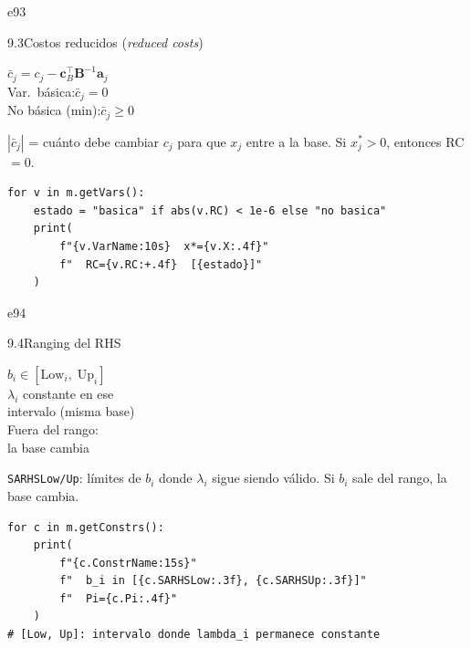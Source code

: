 \documentclass[10pt,a4paper]{article}
\newlength{\mathcolw}
\newlength{\codecolw}
\newcommand{\entryheader}[2][]{%
  \needspace{5cm}%
  \vspace{6pt}%
  \ifx\relax#1\relax\else\phantomsection\hypertarget{#1}{}\fi%
  \noindent%
  \begin{tcolorbox}[
    colback=subsecbg!18,
    colframe=subsecbg!45,
    sharp corners, boxrule=0.4pt,
    left=5pt, right=5pt, top=2pt, bottom=2pt,
    fontupper=\small\bfseries\sffamily,
  ]
  #2
  \end{tcolorbox}%
  \vspace{2pt}%
}
\newcommand{\py}[1]{\texttt{\small #1}}
\begin{document}
\vspace{4pt}

\entryheader[e93]{9.3\quad Costos reducidos (\textit{reduced costs})}
\noindent
\begin{minipage}[t]{\mathcolw}
    \begin{tcolorbox}[mathbox]
        $\bar{c}_j = c_j - \mathbf{c}_B^\top \mathbf{B}^{-1} \mathbf{a}_j$\\[6pt]
        Var.\ b\'asica:\enspace $\bar{c}_j = 0$\\[2pt]
        No b\'asica (min):\enspace $\bar{c}_j \geq 0$
    \end{tcolorbox}
    \vspace{2pt}
    \begin{tcolorbox}[notebox]
        $|\bar{c}_j|$ = cu\'anto debe cambiar $c_j$ para que $x_j$ entre a la base. Si $x_j^* > 0$, entonces RC $= 0$.
    \end{tcolorbox}
\end{minipage}\hspace{0.02\textwidth}%
\begin{minipage}[t]{\codecolw}
    \begin{lstlisting}[style=gurobipy]
for v in m.getVars():
    estado = "basica" if abs(v.RC) < 1e-6 else "no basica"
    print(
        f"{v.VarName:10s}  x*={v.X:.4f}"
        f"  RC={v.RC:+.4f}  [{estado}]"
    )
    \end{lstlisting}
\end{minipage}

\vspace{4pt}

\entryheader[e94]{9.4\quad Ranging del RHS}
\noindent
\begin{minipage}[t]{\mathcolw}
    \begin{tcolorbox}[mathbox]
        $b_i \in [\text{Low}_i,\;\text{Up}_i]$\\[6pt]
        $\lambda_i$ constante en ese\\ intervalo (misma base)\\[4pt]
        Fuera del rango:\\ la base cambia
    \end{tcolorbox}
    \vspace{2pt}
    \begin{tcolorbox}[notebox]
        \py{SARHSLow/Up}: l\'imites de $b_i$ donde $\lambda_i$ sigue siendo v\'alido. Si $b_i$ sale del rango, la base cambia.
    \end{tcolorbox}
\end{minipage}\hspace{0.02\textwidth}%
\begin{minipage}[t]{\codecolw}
    \begin{lstlisting}[style=gurobipy]
for c in m.getConstrs():
    print(
        f"{c.ConstrName:15s}"
        f"  b_i in [{c.SARHSLow:.3f}, {c.SARHSUp:.3f}]"
        f"  Pi={c.Pi:.4f}"
    )
# [Low, Up]: intervalo donde lambda_i permanece constante
    \end{lstlisting}
\end{minipage}
\end{document}
